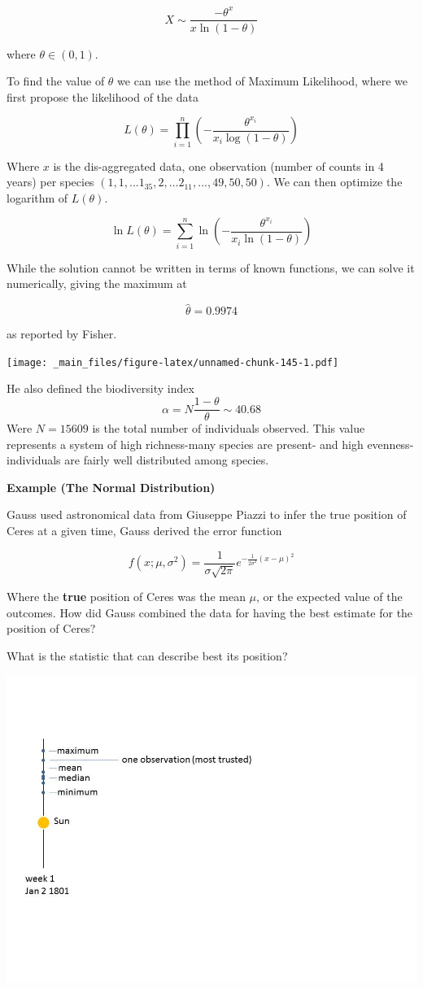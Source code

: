 \documentclass[
]{book}
\begin{document}
\[X \sim \frac{-\theta^x}{x\ln(1-\theta)}\]

where \(\theta \in (0,1)\).

To find the value of \(\theta\) we can use the method of Maximum Likelihood, where we first propose the likelihood of the data

\[
L(\theta) = \prod_{i=1}^{n} \left( -\frac{\theta^{x_i}}{x_i \log(1 - \theta)} \right)
\]

Where \(x\) is the dis-aggregated data, one observation (number of counts in 4 years) per species \((1, 1, ...1_{35}, 2, ...2_{11}, ..., 49, 50, 50)\). We can then optimize the logarithm of \(L(\theta)\).

\[
\ln L(\theta) 
= \sum_{i=1}^{n} \ln\left( -\frac{\theta^{x_i}}{x_i \ln(1 - \theta)} \right)
\]

While the solution cannot be written in terms of known functions, we can solve it numerically, giving the maximum at

\[\hat{\theta}=0.9974\]

as reported by Fisher.

\texttt{[image: \_main\_files/figure-latex/unnamed-chunk-145-1.pdf]}

He also defined the biodiversity index \[\alpha=N \frac{1-\theta}{\theta}\sim 40.68\]
Were \(N=15609\) is the total number of individuals observed. This value represents a system of high richness-many species are present- and high evenness-individuals are fairly well distributed among species.

\textbf{Example (The Normal Distribution)}

Gauss used astronomical data from Giuseppe Piazzi to infer the true position of Ceres at a given time, Gauss derived the error function

\[f(x; \mu, \sigma^2)= \frac{1}{\sigma \sqrt{2 \pi}} e^{-\frac{1}{2\sigma^2} (x-\mu)^2}\]

Where the \textbf{true} position of Ceres was the mean \(\mu\), or the expected value of the outcomes. How did Gauss combined the data for having the best estimate for the position of Ceres?

What is the statistic that can describe best its position?

\includegraphics{./figures/cerestime.JPG}
\end{document}
